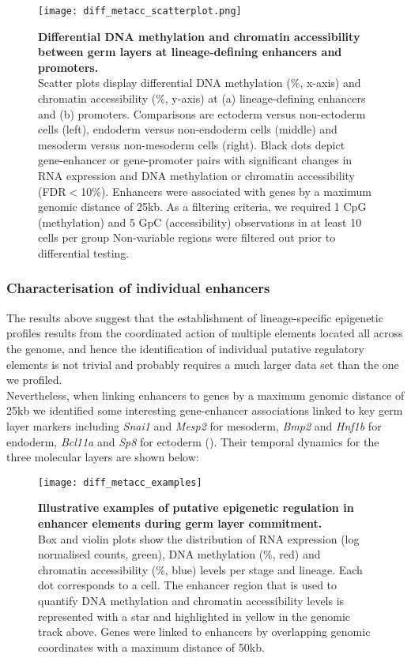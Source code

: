 \begin{figure}[H]
	\centering
	\texttt{[image: diff\_metacc\_scatterplot.png]}
	\caption[]{
	\textbf{Differential DNA methylation and chromatin accessibility between germ layers at lineage-defining enhancers and promoters.} \\
	Scatter plots display differential DNA methylation (\%, x-axis) and chromatin accessibility (\%, y-axis) at (a) lineage-defining enhancers and (b) promoters. Comparisons are ectoderm versus non-ectoderm cells (left), endoderm versus non-endoderm cells (middle) and mesoderm versus non-mesoderm cells (right). Black dots depict gene-enhancer or gene-promoter pairs with significant changes in RNA expression and DNA methylation or chromatin accessibility (FDR$<$10\%). Enhancers were associated with genes by a maximum genomic distance of 25kb. As a filtering criteria, we required 1 CpG (methylation) and 5 GpC (accessibility) observations in at least 10 cells per group Non-variable regions were filtered out prior to differential testing.
	}
	\label{fig:diff_metacc_scatterplot}
\end{figure}

\subsubsection{Characterisation of individual enhancers}

The results above suggest that the establishment of lineage-specific epigenetic profiles results from the coordinated action of multiple elements located all across the genome, and hence the identification of individual putative regulatory elements is not trivial and probably requires a much larger data set than the one we profiled.\\
Nevertheless, when linking enhancers to genes by a maximum genomic distance of 25kb we identified some interesting gene-enhancer associations linked to key germ layer markers including \textit{Snai1} and \textit{Mesp2} for mesoderm, \textit{Bmp2} and \textit{Hnf1b} for endoderm, \textit{Bcl11a} and \textit{Sp8} for ectoderm (). Their temporal dynamics for the three molecular layers are shown below:

\begin{figure}[H]
	\centering
	\texttt{[image: diff\_metacc\_examples]}
	\caption[]{
	\textbf{Illustrative examples of putative epigenetic regulation in enhancer elements during germ layer commitment.} \\
	Box and violin plots show the distribution of RNA expression (log normalised counts, green), DNA methylation (\%, red) and chromatin accessibility (\%, blue) levels per stage and lineage. Each dot corresponds to a cell. The enhancer region that is used to quantify DNA methylation and chromatin accessibility levels is represented with a star and highlighted in yellow in the genomic track above. Genes were linked to enhancers by overlapping genomic coordinates with a maximum distance of 50kb.}
	\label{fig:diff_metacc_examples}
\end{figure}



